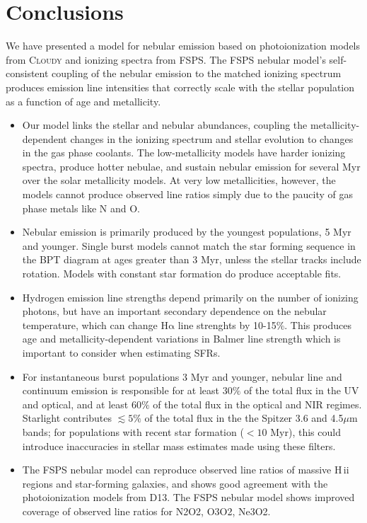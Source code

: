 \documentclass[twocolumn, tighten]{aastex61}
\newcommand{\FSPS}{{\sc FSPS}\xspace}
\newcommand{\Cloudy}{\textsc{Cloudy}\xspace}
\newcommand{\ha}{\ensuremath{\mathrm{H\alpha}}}
\newcommand{\hii}{H\,{\sc ii}\xspace}
\begin{document}
\section{Conclusions}\label{sec:conclusions}

We have presented a model for nebular emission based on photoionization models from \Cloudy and ionizing spectra from \FSPS. The \FSPS nebular model's self-consistent coupling of the nebular emission to the matched ionizing spectrum produces emission line intensities that correctly scale with the stellar population as a function of age and metallicity.

\begin{itemize}
\item Our model links the stellar and nebular abundances, coupling the metallicity-dependent changes in the ionizing spectrum and stellar evolution to changes in the gas phase coolants. The low-metallicity models have harder ionizing spectra, produce hotter nebulae, and sustain nebular emission for several Myr over the solar metallicity models. At very low metallicities, however, the models cannot produce observed line ratios simply due to the paucity of gas phase metals like N and O.
\item Nebular emission is primarily produced by the youngest populations, 5 Myr and younger. Single burst models cannot match the star forming sequence in the BPT diagram at ages greater than 3 Myr, unless the stellar tracks include rotation. Models with constant star formation do produce acceptable fits.
\item Hydrogen emission line strengths depend primarily on the number of ionizing photons, but have an important secondary dependence on the nebular temperature, which can change \ha{} line strenghts by 10-15\%. This produces age and metallicity-dependent variations in Balmer line strength which is important to consider when estimating SFRs.
\item For instantaneous burst populations 3 Myr and younger, nebular line and continuum emission is responsible for at least $30\%$ of the total flux in the UV and optical, and at least $60\%$ of the total flux in the optical and NIR regimes. Starlight contributes $\lesssim5\%$ of the total flux in the the Spitzer 3.6 and 4.5$\mu$m bands; for populations with recent star formation ($<10$ Myr), this could introduce inaccuracies in stellar mass estimates made using these filters.
\item The \FSPS nebular model can reproduce observed line ratios of massive \hii regions and star-forming galaxies, and shows good agreement with the photoionization models from D13. The FSPS nebular model shows improved coverage of observed line ratios for N2O2, O3O2, Ne3O2.

\end{itemize}
\end{document}
